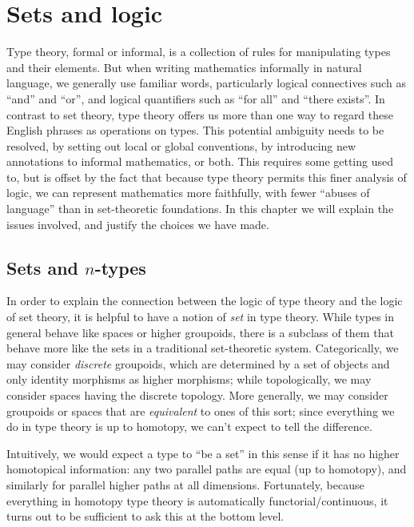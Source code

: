 \chapter{Sets and logic}
\label{cha:logic}

Type theory, formal or informal, is a collection of rules for manipulating types and their elements.
But when writing mathematics informally in natural language, we generally use familiar words, particularly logical connectives such as ``and'' and ``or'', and logical quantifiers such as ``for all'' and ``there exists''.
In contrast to set theory, type theory offers us more than one way to regard these English phrases as operations on types.
This potential ambiguity needs to be resolved, by setting out local or global conventions, by introducing new annotations to informal mathematics, or both.
This requires some getting used to, but is offset by the fact that because type theory permits this finer analysis of logic, we can represent mathematics more faithfully, with fewer ``abuses of language'' than in set-theoretic foundations.
In this chapter we will explain the issues involved, and justify the choices we have made.

\section{Sets and \texorpdfstring{$n$}{n}-types}
\label{sec:basics-sets}

In order to explain the connection between the logic of type theory and the logic of set theory, it is helpful to have a notion of \emph{set} in type theory.
While types in general behave like spaces or higher groupoids, there is a subclass of them that behave more like the sets in a traditional set-theoretic system.
Categorically, we may consider \emph{discrete} groupoids, which are determined by a set of objects and only identity morphisms as higher morphisms; while topologically, we may consider spaces having the discrete topology.
More generally, we may consider groupoids or spaces that are \emph{equivalent} to ones of this sort; since everything we do in type theory is up to homotopy, we can't expect to tell the difference.

Intuitively, we would expect a type to ``be a set'' in this sense if it has no higher homotopical information: any two parallel paths are equal (up to homotopy), and similarly for parallel higher paths at all dimensions.
Fortunately, because everything in homotopy type theory is automatically functorial/continuous, it turns out to be sufficient to ask this at the bottom level.

